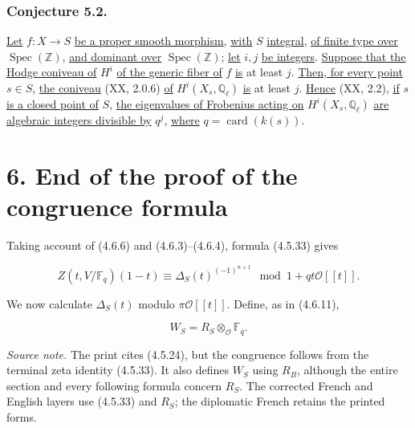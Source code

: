 \subsubsection*{Conjecture 5.2.}
\underline{Let} $f:X\to S$ \underline{be a proper smooth morphism}, \underline{with} $S$ \underline{integral}, \underline{of finite
type over} $\operatorname{Spec}(\mathbb Z)$, \underline{and dominant over}
$\operatorname{Spec}(\mathbb Z)$; \underline{let} $i,j$ \underline{be integers}.  \underline{Suppose that the
Hodge coniveau of} $H^i$ \underline{of the generic fiber of} $f$ \underline{is} at least $j$.  \underline{Then,
for every point} $s\in S$, \underline{the coniveau} (XX, 2.0.6) \underline{of}
$H^i(X_s,\mathbb Q_\ell)$ \underline{is} at least $j$.  \underline{Hence} (XX, 2.2), \underline{if} $s$ \underline{is a
closed point of} $S$, \underline{the eigenvalues of Frobenius acting on}
$H^i(X_s,\mathbb Q_\ell)$ \underline{are algebraic integers divisible by} $q^j$, \underline{where}
$q=\operatorname{card}(k(s))$.

\section*{6. End of the proof of the congruence formula}

Taking account of (4.6.6) and (4.6.3)--(4.6.4), formula (4.5.33) gives

\begin{equation}\tag{6.0.1}
Z(t,V/\mathbb F_q)(1-t)
\equiv\Delta_S(t)^{(-1)^{n+1}}
\mod{1+qt\mathcal O[[t]]}.
\end{equation}

We now calculate $\Delta_S(t)$ modulo $\pi\mathcal O[[t]]$.  Define, as in
(4.6.11),

\begin{equation}\tag{6.0.2}
W_S=R_S\otimes_{\mathcal O}\mathbb F_q.
\end{equation}

\medskip
\noindent\emph{Source note.}
The print cites (4.5.24), but the congruence follows from the terminal zeta
identity (4.5.33).  It also defines $W_S$ using $R_B$, although the entire
section and every following formula concern $R_S$.  The corrected French
and English layers use (4.5.33) and $R_S$; the diplomatic French retains
the printed forms.
